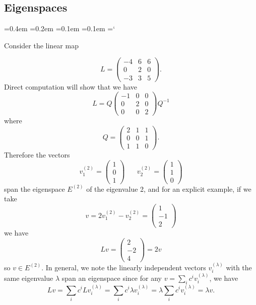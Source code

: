 
\subsection*{Eigenspaces}

{\ttfamily
{}\font=0.4em
\font=0.2em
\font=0.1em
\font=0.1em
\hyphenchar\font=`\-


\hypertarget{scripts_eigenvalues_eigenvectors_ii_eigenspaces}{Consider the linear map}
\[
L = \begin{pmatrix}
-4 & 6 & 6 \\
0 & 2 & 0 \\
-3 & 3 &5
\end{pmatrix}.
\]
Direct computation will show that we have
\[
L = Q \begin{pmatrix}
-1 & 0 & 0 \\
0 & 2 & 0 \\
0 & 0 & 2
\end{pmatrix} Q^{-1}
\]
where
\[
Q = \begin{pmatrix}
2 & 1 & 1 \\
0 & 0 & 1 \\
1 & 1 & 0
\end{pmatrix}.
\]
Therefore the vectors
\[
v_1^{(2)} = \begin{pmatrix}1 \\ 0 \\ 1\end{pmatrix} \hspace{20pt} v_2^{(2)} = \begin{pmatrix}1 \\ 1 \\ 0\end{pmatrix}
\]
span the eigenspace $E^{(2)}$ of the eigenvalue 2, and for an explicit example, if we take
\[
v = 2 v_1^{(2)} - v_2^{(2)} = \begin{pmatrix} 1 \\ -1 \\ 2\end{pmatrix}
\]
we have
\[
L v = \begin{pmatrix} 2 \\ -2 \\ 4\end{pmatrix} = 2 v
\]
so $v \in E^{(2)}$. In general, we note the linearly independent vectors $v_i^{(\lambda)}$ with the same eigenvalue $\lambda$ span an eigenspace since for any $v = \sum_i c^i v_i^{(\lambda)}$, we have
\[
Lv = \sum_i c^i Lv_i^{(\lambda)} = \sum_i c^i \lambda v_i^{(\lambda)} = \lambda \sum_i c^i v_i^{(\lambda)} = \lambda v.
\]


} %

